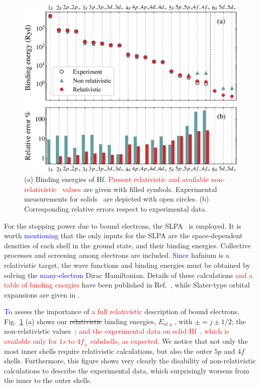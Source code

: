 \documentclass[aps,pra,reprint,superscriptaddress]{revtex4-1}
\def\clau#1{\textcolor{red}{#1}}
\def\ale#1{\textcolor{blue}{#1}}
\begin{document}
\begin{figure}[!t]
\centering
\includegraphics[width=11.cm]{bindener.eps}
\caption{(a) Binding energies of Hf. \clau{Present relativistic and available non-relativistic~\cite{badnell97}  
values} are given with filled symbols. Experimental measurements 
for solids~\cite{williams1995} are depicted with open circles. 
(b) Corresponding relative errors respect to experimental data.}
\label{Binding_E}
\end{figure}

For the stopping power due to bound electrons, the SLPA~\cite{mon17,mon13} 
is employed. It is worth \ale{mentioning} that the only inputs for the SLPA 
are the space-dependent densities of each shell in the ground state, 
and their binding energies. Collective processes and screening among 
electrons are included. \ale{Since} hafnium is a relativistic target, the 
wave functions and binding energies must be obtained by solving the 
\ale{many-electron} Dirac Hamiltonian. Details of these calculations 
\clau{and a table of binding energies} have been published in 
Ref.~\cite{mendez2019}, while Slater-type orbital expansions are 
given in \cite{Hf_arxiv}.

\ale{To} assess the importance of  \clau{a full relativistic} description of 
bound electrons, Fig.~\ref{Binding_E} (a) shows our \st{relativistic} binding 
energies, $E_{nl\pm}$, with $\pm=j\pm1/2$; the 
non-relativistic values~\cite{badnell97}; \clau{and the experimental data on 
solid Hf~\cite{williams1995}, which is available only for $1s$ to $4f_{\pm}$ 
subshells, as expected.} 
We notice that not only the most inner shells require relativistic calculations, but also the outer $5p$ and $4f$ shells. Furthermore, this figure shows very clearly the disability of non-relativistic calculations to describe the experimental data, which surprisingly worsens from the inner to the outer shells.
\end{document}
